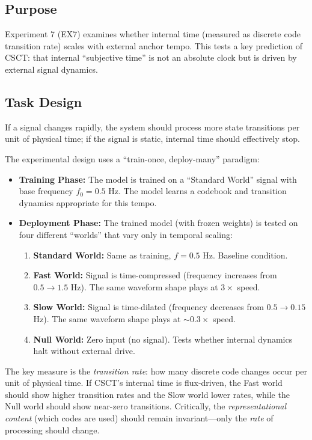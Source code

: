 \documentclass{article}
\begin{document}
\subsection{Purpose}
Experiment 7 (EX7) examines whether internal time (measured as discrete code transition rate) scales with external anchor tempo. This tests a key prediction of CSCT: that internal ``subjective time'' is not an absolute clock but is driven by external signal dynamics.

\subsection{Task Design}
If a signal changes rapidly, the system should process more state transitions per unit of physical time; if the signal is static, internal time should effectively stop.

The experimental design uses a ``train-once, deploy-many'' paradigm:
\begin{itemize}
    \item \textbf{Training Phase:} The model is trained on a ``Standard World'' signal with base frequency $f_0 = 0.5$ Hz. The model learns a codebook and transition dynamics appropriate for this tempo.
    \item \textbf{Deployment Phase:} The trained model (with frozen weights) is tested on four different ``worlds'' that vary only in temporal scaling:
    \begin{enumerate}
        \item \textbf{Standard World:} Same as training, $f = 0.5$ Hz. Baseline condition.
        \item \textbf{Fast World:} Signal is time-compressed (frequency increases from $0.5 \to 1.5$ Hz). The same waveform shape plays at $3\times$ speed.
        \item \textbf{Slow World:} Signal is time-dilated (frequency decreases from $0.5 \to 0.15$ Hz). The same waveform shape plays at $\sim 0.3\times$ speed.
        \item \textbf{Null World:} Zero input (no signal). Tests whether internal dynamics halt without external drive.
    \end{enumerate}
\end{itemize}

The key measure is the \textit{transition rate}: how many discrete code changes occur per unit of physical time. If CSCT's internal time is flux-driven, the Fast world should show higher transition rates and the Slow world lower rates, while the Null world should show near-zero transitions. Critically, the \textit{representational content} (which codes are used) should remain invariant---only the \textit{rate} of processing should change.
\end{document}
